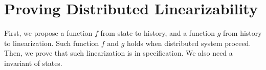 
\section{Proving Distributed Linearizability}
\label{sec:proving distributed linearizability} 



First, we propose a function $f$ from state to history, and a function $g$ from history to linearization. Such function $f$ and $g$ holds when distributed system proceed. Then, we prove that such linearization is in specification. We also need a invariant of states.




